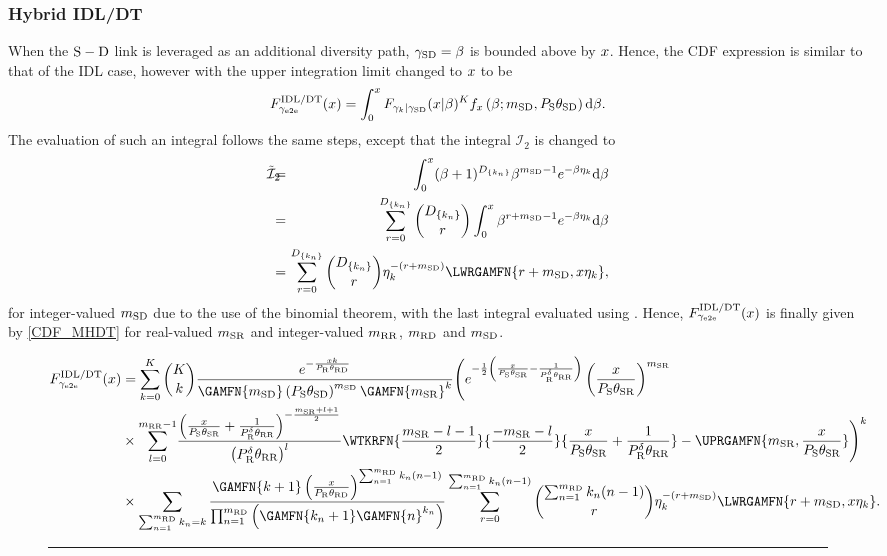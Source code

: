 \documentclass[10pt,journal]{IEEEtran}
\begin{document}
\subsubsection{Hybrid \ac{IDL}/\ac{DT}}
When the ${\rm S} - {\rm D}$ link is leveraged as an additional diversity path, $\gamma_{{\rm S} {\rm D}}=\beta$ is bounded above by $x$. Hence, the \ac{CDF} expression is similar to that of the \ac{IDL} case, however with the upper integration limit changed to $x$ to be
\begin{eqnarray}
F_{\gamma_{\rm e2e}}^{\text{IDL/DT}}(x)
=\int_0^x F_{\gamma_{k} \vert \gamma_{{\rm S} {\rm D}}}(x \vert \beta)^K f_x\left(\beta;{m_{{\rm S} {\rm D}}},P_{{\rm S}}{\theta_{{\rm S} {\rm D}}}\right) \mathrm{d}\beta.
\end{eqnarray}
The evaluation of such an integral follows the same steps, except that the integral $\mathcal{I}_2$ is changed to
\begin{eqnarray}
\tilde{\mathcal{I}}_2
\!\!\!\!&=&\!\!\!\!\int_0^{\RVval} (\beta+1)^{D_{\{k_n\}}}\beta^{\msd-1}e^{-\beta\eta_k} \mathrm{d}\beta\nonumber\\
\!\!\!\!&=&\!\!\!\! \sum_{r=0}^{D_{\{k_n\}}} {D_{\{k_n\}} \choose r}\int_0^{\RVval}\beta^{r+\msd-1}e^{-\beta\eta_k} \mathrm{d}\beta\nonumber\\
\!\!\!\!&=&\!\!\!\! \sum_{r=0}^{D_{\{k_n\}}} {D_{\{k_n\}} \choose r} \eta_k^{-(r+\msd)} \LWRGAMFN{r+\msd, \RVval\eta_k},
\end{eqnarray}
for integer-valued ${m_{{\rm S} {\rm D}}}$ due to the use of the binomial theorem, with the last integral evaluated using \cite[Eq. 3.381-1]{gradshteyn_ryzhik}. Hence, $F_{\gamma_{\rm e2e}}^{\text{IDL/DT}}(x)$ is finally given by \eqref{CDF_MHDT} for real-valued ${m_{{\rm S} {\rm R}}}$ and integer-valued ${m_{{\rm R} {\rm R}}}$, ${m_{{\rm R} {\rm D}}}$ and ${m_{{\rm S} {\rm D}}}$.

\begin{figure*}
\centering
\begin{footnotesize}
\begin{equation}
\begin{split}
\CDFMHDT
&=\sum_{k=0}^K {K \choose k} \frac{e^{-\frac{\RVval k}{\PR\thetard}}}{\GAMFN{\msd}\left(\PS\thetasd\right)^{\msd}\GAMFN{\msr}^k} \Bigg(e^{-\frac{1}{2}\left(\frac{\RVval}{\PS\thetasr}-\frac{1}{\PR^\PWRSCL\thetarr}\right)}\left(\frac{\RVval}{\PS\thetasr}\right)^{\msr}\\
& \times {\displaystyle\sum_{l=0}^{\mrr-1}} \frac{\left(\frac{\RVval}{\PS\thetasr}+\frac{1}{\PR^\PWRSCL\thetarr}\right)^{-\frac{\msr+l+1}{2}}}{\left(\PR^\PWRSCL\thetarr\right)^{l}}
\WTKRFN{\frac{\msr-l-1}{2}}{\frac{-\msr-l}{2}}{\frac{\RVval}{\PS\thetasr}+\frac{1}{\PR^\PWRSCL\thetarr}}        - \UPRGAMFN{\msr,\frac{\RVval}{\PS\thetasr}}  \Bigg)^k\\
&\times \sum_{\sum_{n=1}^{\mrd} k_{n} = k} \frac{\GAMFN{k+1}\left(\frac{\RVval}{\PR\thetard}\right)^{\sum_{n=1}^{\mrd}k_n(n-1)}}{\prod_{n=1}^{\mrd}\left(\GAMFN{k_n+1}\GAMFN{n}^{k_n}\right)}
\sum_{r=0}^{\sum_{n=1}^{\mrd}k_n(n-1)} {\sum_{n=1}^{\mrd}k_n(n-1) \choose r} \eta_k^{-(r+\msd)} \LWRGAMFN{r+\msd, \RVval\eta_k}.
\end{split}
\label{CDF_MHDT}
\end{equation}
\end{footnotesize}
\hrule
\vspace{-2mm}
\end{figure*}
\end{document}
